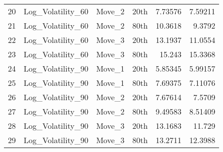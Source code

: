 \begin{tabular}{rlllrr}
 20 & Log\_Volatility\_60   & Move\_2        & 20th         &  7.73576 &  7.59211 \\
 21 & Log\_Volatility\_60   & Move\_2        & 80th         & 10.3618  &  9.3792  \\
 22 & Log\_Volatility\_60   & Move\_3        & 20th         & 13.1937  & 11.0554  \\
 23 & Log\_Volatility\_60   & Move\_3        & 80th         & 15.243   & 15.3368  \\
 24 & Log\_Volatility\_90   & Move\_1        & 20th         &  5.85345 &  5.99157 \\
 25 & Log\_Volatility\_90   & Move\_1        & 80th         &  7.69375 &  7.11076 \\
 26 & Log\_Volatility\_90   & Move\_2        & 20th         &  7.67614 &  7.5709  \\
 27 & Log\_Volatility\_90   & Move\_2        & 80th         &  9.49583 &  8.51409 \\
 28 & Log\_Volatility\_90   & Move\_3        & 20th         & 13.1683  & 11.729   \\
 29 & Log\_Volatility\_90   & Move\_3        & 80th         & 13.2711  & 12.3988  \\
\hline
\end{tabular}
